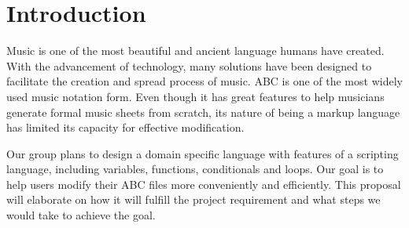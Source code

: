 \section{Introduction}

Music is one of the most beautiful and ancient language humans have created. With the advancement of technology, many solutions have been designed to facilitate the creation and spread process of music. ABC is one of the most widely used music notation form. Even though it has great features to help musicians generate formal music sheets from scratch, its nature of being a markup language has limited its capacity for effective modification.

Our group plans to design a domain specific language with features of a scripting language, including variables, functions, conditionals and loops. Our goal is to help users modify their ABC files more conveniently and efficiently. This proposal will elaborate on how it will fulfill the project requirement and what steps we would take to achieve the goal.

